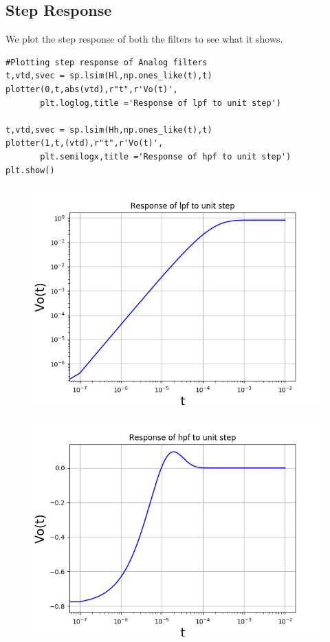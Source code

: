 \documentclass[11pt, a4paper]{article}
\begin{document}
\subsection{Step Response}
{
We plot the step response of both the filters to see what it shows.
}
\begin{verbatim}
#Plotting step response of Analog filters
t,vtd,svec = sp.lsim(Hl,np.ones_like(t),t)
plotter(0,t,abs(vtd),r"t",r'Vo(t)',
       plt.loglog,title ='Response of lpf to unit step')

t,vtd,svec = sp.lsim(Hh,np.ones_like(t),t)
plotter(1,t,(vtd),r"t",r'Vo(t)',
       plt.semilogx,title ='Response of hpf to unit step')
plt.show()

\end{verbatim}
\begin{figure}[!tbh]
   	\centering
   	\includegraphics[scale=0.5]{img3.png}
   	\label{fig:32}
   \end{figure}
\begin{figure}[!tbh]
   	\centering
   	\includegraphics[scale=0.5]{img4.png}
   	\label{fig:32}
   \end{figure}
\end{document}
